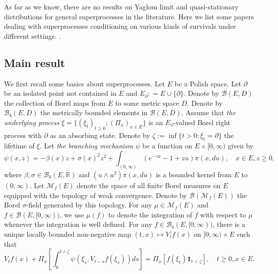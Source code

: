 \documentclass[12pt,a4paper]{amsart}
\numberwithin{equation}{section}
\theoremstyle{plain}
\theoremstyle{definition}
\theoremstyle{remark}
\begin{document}
	As far as we know, there are no results on
	Yaglom limit and quasi-stationary distributions for general superprocesses in the  literature.
	Here we list some papers dealing with superprocesses conditioning on various kinds of survivals under different settings:
	\cite{ChampagnatRaelly2008Limit, Etheridge2003A-decomposition, Evans1992The-entrance, EvansPerkins1990Measure-valued, LiuRen2009Some, RenSongSun2019Spine, RenSongSun2018Limit, RenSongZhang2015Limit, Serlet1996Occupation}.

\subsection{Main result} \label{sec:super}

	We first recall some basics about superprocesses.
	Let $E$ be a Polish space.
    Let $\partial$ be an isolated point not contained in $E$ and $E_\partial: = E \cup \{\partial\}$.
Denote by $\mathcal B(E, D)$ the collection of Borel maps  from $E$ to some metric space $D$.
    Denote by $\mathcal B_b(E,D)$ the metrically bounded elements in $\mathcal B(E,D)$.
	Assume that \emph{the underlying process} $\xi = \{(\xi_t)_{t\ge0}; (\Pi_x)_{x\in E}\}$ is an $E_\partial$-valued Borel right process with $\partial$ as an absorbing state.
Denote by $\zeta:=\inf\{t>0: \xi_t=\partial\}$ the lifetime of $\xi$.
	Let \emph{the branching mechanism} $\psi$ be a function on $E \times [0,\infty)$ given by
\begin{equation}
	\psi(x,z)
	= -\beta(x) z + \sigma(x)^2 z^2 + \int_{(0,\infty)} (e^{-zu} -1 + zu) \pi(x,du),
	\quad x\in E, z\geq 0,
\end{equation}
	where $\beta, \sigma \in \mathcal B_b(E,\mathbb R)$ and $(u \wedge u^2) \pi(x,du)$ is a bounded kernel from $E$ to $(0,\infty)$.
	Let $\mathcal M_f(E)$ denote the space of all finite Borel measures on $E$ equipped with the topology of weak convergence.
	Denote by $\mathcal B(\mathcal M_f(E))$ the Borel $\sigma$-field generated by this topology.
For any $\mu\in\mathcal M_f(E)$ and $f \in \mathcal B(E, [0,\infty))$, we use $\mu(f)$ to denote the integration of $f$ with respect to $\mu$ whenever the integration is well defined.
	For any $f \in \mathcal B_b(E, [0,\infty))$, there is a unique locally bounded non-negative map $(t,x)\mapsto V_tf(x)$ on $[0,\infty) \times E$ such that
\begin{equation} \label{eq:BGD.1}
	V_tf(x) + \Pi_x \left[ \int_0^{t\wedge \zeta} \psi \left(\xi_s, V_{t-s}f(\xi_s)\right) ds\right]
	= \Pi_x\left[ f(\xi_t)  \mathbf 1_{t < \zeta}\right], \quad t\geq 0, x\in E.
\end{equation}
\end{document}
